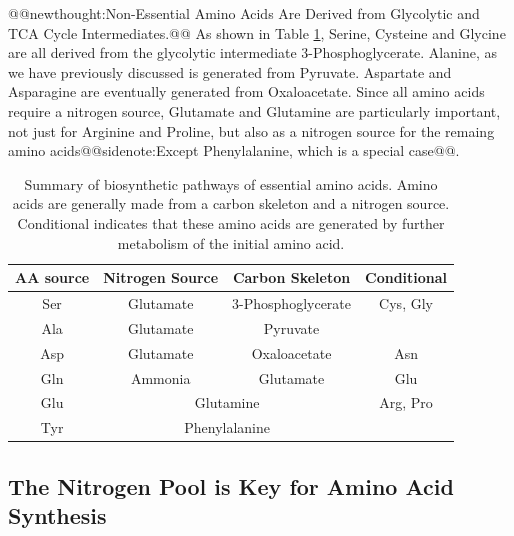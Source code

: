 \documentclass{tufte-handout}
\makeatletter
\def\newthought#1{@@newthought:#1@@}
\def\sidenote#1{@@sidenote:#1@@}
\makeatother
\begin{document}
\newthought{Non-Essential Amino Acids Are Derived from Glycolytic and TCA Cycle Intermediates.}  As shown in Table \ref{tab:aa-biosynthesis-summary}, Serine, Cysteine and Glycine are all derived from the glycolytic intermediate 3-Phosphoglycerate.  Alanine, as we have previously discussed is generated from Pyruvate.  Aspartate and Asparagine are eventually generated from Oxaloacetate.  Since all amino acids require a nitrogen source, Glutamate and Glutamine are particularly important, not just for Arginine and Proline, but also as a nitrogen source for the remaing amino acids\sidenote{Except Phenylalanine, which is a special case}. 

\begin{table}[h]
\centering
\caption{Summary of biosynthetic pathways of essential amino acids.  Amino acids are generally made from a carbon skeleton and a nitrogen source.  Conditional indicates that these amino acids are generated by further metabolism of the initial amino acid.}
\label{tab:aa-biosynthesis-summary}
\begin{tabular}{|c|c|c|c|}
\hline
AA source        & Nitrogen Source  & Carbon Skeleton & Conditional      \\ \hline
Ser    & Glutamate                            & 3-Phosphoglycerate                                 & Cys, Gly            \\ \hline
Ala   & Glutamate                            & Pyruvate                             &                              \\ \hline
Asp & Glutamate                         & Oxaloacetate                        & Asn                   \\ \hline
Gln & Ammonia                              & Glutamate                            &   Glu                           \\ \hline
Glu & \multicolumn{2}{c|}{Glutamine}                                              & Arg, Pro \\ \hline
Tyr  & \multicolumn{2}{c|}{Phenylalanine}                                          &                              \\ \hline
\end{tabular}
\end{table}

\subsection{The Nitrogen Pool is Key for Amino Acid Synthesis}
\end{document}
